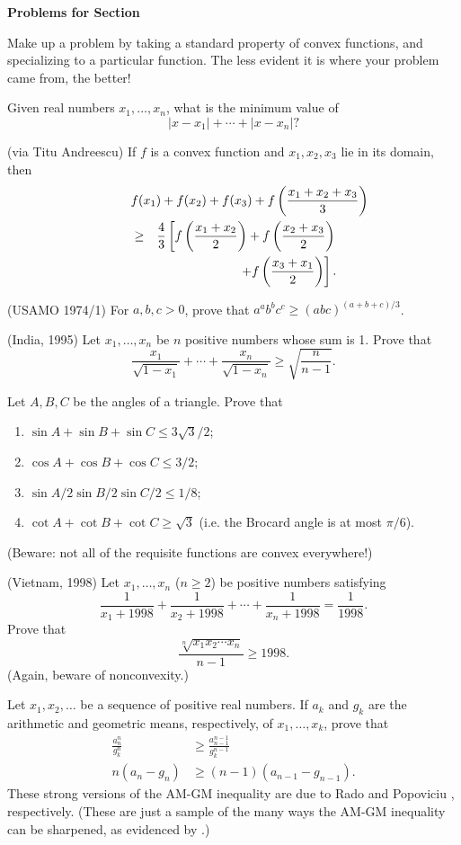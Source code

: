 \documentclass[12pt]{report}
\def\be{\begin{enumerate}}
\def\ee{\end{enumerate}}
\def\ii{\item}
\newcounter{exc}
\numberwithin{exc}{section}
\newenvironment{exer}{\vspace{0.1in}
\noindent \textbf{Problems for Section~\thesection} \vspace{0.1in}
\begin{list}{\arabic{exc}.}{\usecounter{exc}}}{\end{list}}
\begin{document}
\begin{exer}
\ii
Make up a problem by taking a standard property of convex functions, 
and specializing to a particular function. The less evident it is 
where your problem came from, the better!
\ii
Given real numbers $x_{1}, \dots, x_{n}$, what is the minimum value of 
\[
|x-x_{1}| + \cdots + |x-x_{n}|?
\]
\ii
(via Titu Andreescu)
If $f$ is a convex function and $x_1, x_2, x_3$ lie in its domain, 
then
\begin{eqnarray*}
\lefteqn{f(x_1) + f(x_2) + f(x_3) + f\left( 
\frac{x_1+x_2+x_3}{3}\right)} && \\
&\geq& \frac 43 \left[ f\left(\frac{x_1+x_2}{2} \right) + 
f\left(\frac{x_2+x_3}{2} \right) \right. \\
&& \left. + f\left(\frac{x_3+x_1}{2} \right)
\right].
\end{eqnarray*}
\ii
(USAMO 1974/1)
For $a,b,c>0$, prove that $a^ab^bc^c \geq (abc)^{(a+b+c)/3}$.
\ii (India, 1995)
Let $x_{1}, \dots, x_{n}$ be $n$ positive numbers whose sum is 1. 
Prove that
\[
\frac{x_{1}}{\sqrt{1-x_{1}}} + \cdots + \frac{x_{n}}{\sqrt{1-x_{n}}} 
\geq \sqrt{\frac{n}{n-1}}.
\]
\ii
Let $A,B,C$ be the angles of a triangle. Prove that
\be
\ii $\sin A + \sin B + \sin C \leq 3\sqrt{3}/2$;
\ii $\cos A + \cos B + \cos C \leq 3/2$;
\ii $\sin A/2 \sin B/2 \sin C/2 \leq 1/8$;
\ii
$\cot A + \cot B + \cot C \geq \sqrt{3}$ (i.e. the Brocard angle is at
most $\pi/6$).
\ee
(Beware: not all of the requisite functions are convex everywhere!)
\ii (Vietnam, 1998)
Let $x_{1}, \dots, x_{n}$ ($n \geq 2$) be positive numbers satisfying
\[
\frac{1}{x_{1}+1998} + \frac{1}{x_{2}+1998} + \cdots + 
\frac{1}{x_{n}+1998} = \frac{1}{1998}.
\]
Prove that
\[
\frac{\sqrt[n]{x_{1}x_{2}\cdots x_{n}}}{n-1} \geq 1998.
\]
(Again, beware of nonconvexity.)
\ii
Let $x_1, x_2, \dots$ be a sequence of positive real numbers.
If $a_k$ and $g_k$ are the arithmetic and geometric means, respectively, of 
$x_1, \dots, x_k$, prove that
\begin{align}
\frac{a_n^n}{g_k^n} &\geq \frac{a_{n-1}^{n-1}}{g_k^{n-1}} \\
n(a_n - g_n) &\geq (n-1)(a_{n-1}-g_{n-1}).
\end{align}
These strong versions of the AM-GM inequality are due to Rado \cite[Theorem~60]{bib:ha} and Popoviciu \cite{bib:pop}, 
respectively. (These are just a sample of the many ways the AM-GM 
inequality can be sharpened, as evidenced by \cite{bib:bmv}.)
\end{exer}
\end{document}
